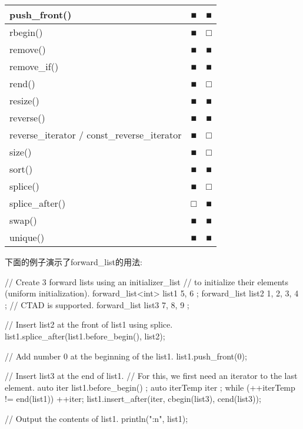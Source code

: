 \begin{longtable}{|l|l|l|}
push\_front()                                & ■             & ■                      \\ \hline
rbegin()                                     & ■             & □                      \\ \hline
remove()                                     & ■             & ■                      \\ \hline
remove\_if()                                 & ■             & ■                      \\ \hline
rend()                                       & ■             & □                      \\ \hline
resize()                                     & ■             & ■                      \\ \hline
reverse()                                    & ■             & ■                      \\ \hline
reverse\_iterator / const\_reverse\_iterator & ■             & □                      \\ \hline
size()                                       & ■             & □                      \\ \hline
sort()                                       & ■             & ■                      \\ \hline
splice()                                     & ■             & □                      \\ \hline
splice\_after()                              & □             & ■                      \\ \hline
swap()                                       & ■             & ■                      \\ \hline
unique()                                     & ■             & ■                      \\ \hline
\end{longtable}

下面的例子演示了forward\_list的用法:

\begin{cpp}
// Create 3 forward lists using an initializer_list
// to initialize their elements (uniform initialization).
forward_list<int> list1 { 5, 6 };
forward_list list2 { 1, 2, 3, 4 }; // CTAD is supported.
forward_list list3 { 7, 8, 9 };

// Insert list2 at the front of list1 using splice.
list1.splice_after(list1.before_begin(), list2);

// Add number 0 at the beginning of the list1.
list1.push_front(0);

// Insert list3 at the end of list1.
// For this, we first need an iterator to the last element.
auto iter { list1.before_begin() };
auto iterTemp { iter };
while (++iterTemp != end(list1)) { ++iter; }
list1.insert_after(iter, cbegin(list3), cend(list3));

// Output the contents of list1.
println("{:n}", list1);
\end{cpp}

